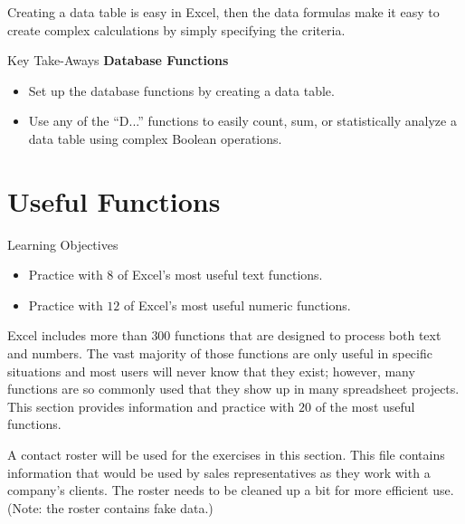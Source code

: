Creating a data table is easy in Excel, then the data formulas make it easy to create complex calculations by simply specifying the criteria.
	
\begin{center}
	\begin{tkwbox}{Key Take-Aways}
		\textbf{Database Functions}
		\\
		\begin{itemize}
			\setlength{\itemsep}{0pt}
			\setlength{\parskip}{0pt}
			\setlength{\parsep}{0pt}
			
			\item Set up the database functions by creating a data table.
			\item Use any of the ``D...'' functions to easily count, sum, or statistically analyze a data table using complex Boolean operations. 
			
		\end{itemize}
	\end{tkwbox}
\end{center}

\section{Useful Functions}

\begin{center}
	\begin{objbox}{Learning Objectives}
		\begin{itemize}
			\setlength{\itemsep}{0pt}
			\setlength{\parskip}{0pt}
			\setlength{\parsep}{0pt}
			
			\item Practice with $ 8 $ of Excel's most useful text functions.
			\item Practice with $ 12 $ of Excel's most useful numeric functions.
			
		\end{itemize}
	\end{objbox}
\end{center}

Excel includes more than $ 300 $ functions that are designed to process both text and numbers. The vast majority of those functions are only useful in specific situations and most users will never know that they exist; however, many functions are so commonly used that they show up in many spreadsheet projects. This section provides information and practice with $ 20 $ of the most useful functions.

A contact roster will be used for the exercises in this section. This file contains information that would be used by sales representatives as they work with a company's clients. The roster needs to be cleaned up a bit for more efficient use. (Note: the roster contains fake data.)

